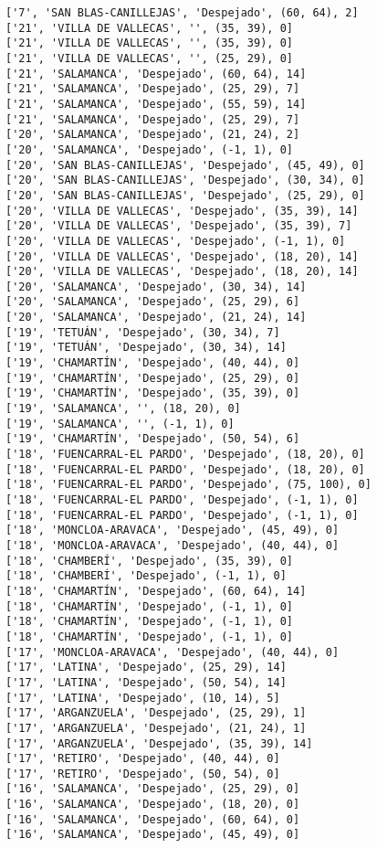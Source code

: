 \documentclass[11pt]{article}
\begin{document}
\begin{Verbatim}[commandchars=\\\{\}]
['7', 'SAN BLAS-CANILLEJAS', 'Despejado', (60, 64), 2]
['21', 'VILLA DE VALLECAS', '', (35, 39), 0]
['21', 'VILLA DE VALLECAS', '', (35, 39), 0]
['21', 'VILLA DE VALLECAS', '', (25, 29), 0]
['21', 'SALAMANCA', 'Despejado', (60, 64), 14]
['21', 'SALAMANCA', 'Despejado', (25, 29), 7]
['21', 'SALAMANCA', 'Despejado', (55, 59), 14]
['21', 'SALAMANCA', 'Despejado', (25, 29), 7]
['20', 'SALAMANCA', 'Despejado', (21, 24), 2]
['20', 'SALAMANCA', 'Despejado', (-1, 1), 0]
['20', 'SAN BLAS-CANILLEJAS', 'Despejado', (45, 49), 0]
['20', 'SAN BLAS-CANILLEJAS', 'Despejado', (30, 34), 0]
['20', 'SAN BLAS-CANILLEJAS', 'Despejado', (25, 29), 0]
['20', 'VILLA DE VALLECAS', 'Despejado', (35, 39), 14]
['20', 'VILLA DE VALLECAS', 'Despejado', (35, 39), 7]
['20', 'VILLA DE VALLECAS', 'Despejado', (-1, 1), 0]
['20', 'VILLA DE VALLECAS', 'Despejado', (18, 20), 14]
['20', 'VILLA DE VALLECAS', 'Despejado', (18, 20), 14]
['20', 'SALAMANCA', 'Despejado', (30, 34), 14]
['20', 'SALAMANCA', 'Despejado', (25, 29), 6]
['20', 'SALAMANCA', 'Despejado', (21, 24), 14]
['19', 'TETUÁN', 'Despejado', (30, 34), 7]
['19', 'TETUÁN', 'Despejado', (30, 34), 14]
['19', 'CHAMARTÍN', 'Despejado', (40, 44), 0]
['19', 'CHAMARTÍN', 'Despejado', (25, 29), 0]
['19', 'CHAMARTÍN', 'Despejado', (35, 39), 0]
['19', 'SALAMANCA', '', (18, 20), 0]
['19', 'SALAMANCA', '', (-1, 1), 0]
['19', 'CHAMARTÍN', 'Despejado', (50, 54), 6]
['18', 'FUENCARRAL-EL PARDO', 'Despejado', (18, 20), 0]
['18', 'FUENCARRAL-EL PARDO', 'Despejado', (18, 20), 0]
['18', 'FUENCARRAL-EL PARDO', 'Despejado', (75, 100), 0]
['18', 'FUENCARRAL-EL PARDO', 'Despejado', (-1, 1), 0]
['18', 'FUENCARRAL-EL PARDO', 'Despejado', (-1, 1), 0]
['18', 'MONCLOA-ARAVACA', 'Despejado', (45, 49), 0]
['18', 'MONCLOA-ARAVACA', 'Despejado', (40, 44), 0]
['18', 'CHAMBERÍ', 'Despejado', (35, 39), 0]
['18', 'CHAMBERÍ', 'Despejado', (-1, 1), 0]
['18', 'CHAMARTÍN', 'Despejado', (60, 64), 14]
['18', 'CHAMARTÍN', 'Despejado', (-1, 1), 0]
['18', 'CHAMARTÍN', 'Despejado', (-1, 1), 0]
['18', 'CHAMARTÍN', 'Despejado', (-1, 1), 0]
['17', 'MONCLOA-ARAVACA', 'Despejado', (40, 44), 0]
['17', 'LATINA', 'Despejado', (25, 29), 14]
['17', 'LATINA', 'Despejado', (50, 54), 14]
['17', 'LATINA', 'Despejado', (10, 14), 5]
['17', 'ARGANZUELA', 'Despejado', (25, 29), 1]
['17', 'ARGANZUELA', 'Despejado', (21, 24), 1]
['17', 'ARGANZUELA', 'Despejado', (35, 39), 14]
['17', 'RETIRO', 'Despejado', (40, 44), 0]
['17', 'RETIRO', 'Despejado', (50, 54), 0]
['16', 'SALAMANCA', 'Despejado', (25, 29), 0]
['16', 'SALAMANCA', 'Despejado', (18, 20), 0]
['16', 'SALAMANCA', 'Despejado', (60, 64), 0]
['16', 'SALAMANCA', 'Despejado', (45, 49), 0]

\end{Verbatim}
\end{document}
